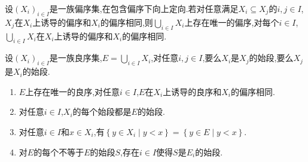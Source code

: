 \begin{lemma}{}{}
	设$\left(X_{i}\right)_{i\in I}$是一族偏序集,在包含偏序下向上定向.若对任意满足$X_{i}\subseteq X_{j}$的$i,j\in I$,$X_{j}$在$X_{i}$上诱导的偏序和$X_{i}$的偏序相同,则$\bigcup\limits_{i\in I}X_{i}$上存在唯一的偏序,对每个$i\in I$,$\bigcup\limits_{i\in I}X_{i}$在$X_{i}$上诱导的偏序和$X_{i}$的偏序相同.
\end{lemma}

\begin{proposition}{}{}
	设$\left(X_{i}\right)_{i\in I}$是一族良序集,$E=\bigcup\limits_{i\in I}X_{i}$,对任意$i,j\in I$,要么$X_{i}$是$X_{j}$的始段,要么$X_{j}$是$X_{i}$的始段.
	\begin{enumerate}
		\item $E$上存在唯一的良序,对任意$i\in I$,$E$在$X_{i}$上诱导的良序和$X_{i}$的偏序相同.
		\item 对任意$i\in I$,$X_{i}$的每个始段都是$E$的始段.
		\item 对任意$i\in I$和$x\in X_{i}$,有$\left\{y\in X_{i}\middle|y<x\right\}=\left\{y\in E\middle|y<x\right\}$.
		\item 对$E$的每个不等于$E$的始段$S$,存在$i\in I$使得$S$是$E_{i}$的始段.
	\end{enumerate}
\end{proposition}




























































